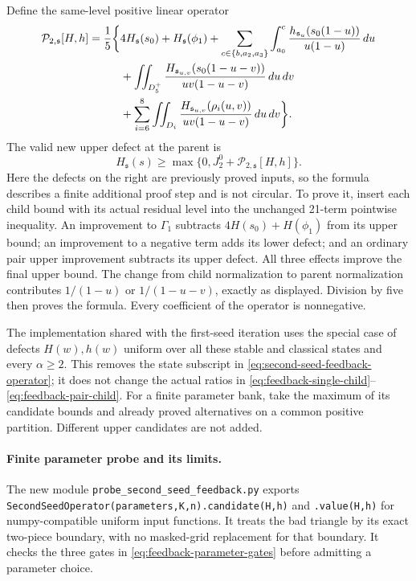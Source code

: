 \documentclass[11pt]{article}
\begin{document}
Define the same-level positive linear operator
\begin{align}
 \mathcal P_{2,\mathfrak s}[H,h]
 =\frac15\bigg\{&4H_{\mathfrak s}(s_0)+H_{\mathfrak s}(\phi_1)
 +\sum_{c\in\{b,a_2,a_3\}}\int_{a_0}^{c}
 \frac{h_{\mathfrak s_u}(s_0(1-u))}{u(1-u)}\,du\notag\\
 &+\iint_{D_5^+}
 \frac{H_{\mathfrak s_{u,v}}(s_0(1-u-v))}
      {uv(1-u-v)}\,du\,dv\notag\\
 &+\sum_{i=6}^8\iint_{D_i}
 \frac{H_{\mathfrak s_{u,v}}(\rho_i(u,v))}
      {uv(1-u-v)}\,du\,dv\bigg\}.
 \label{eq:second-seed-feedback-operator}
\end{align}
The valid new upper defect at the parent is
\begin{equation}\label{eq:second-seed-feedback-bound}
 H_{\mathfrak s}(s)\ge
 \max\{0,J_2^0+\mathcal P_{2,\mathfrak s}[H,h]\}.
\end{equation}
Here the defects on the right are previously proved inputs, so the
formula describes a finite additional proof step and is not circular.
To prove it, insert each child bound with its actual residual level
into the unchanged 21-term pointwise inequality.  An improvement
to $\Gamma_1$ subtracts $4H(s_0)+H(\phi_1)$ from its upper bound;
an improvement to a negative term adds its lower defect; and an
ordinary pair upper improvement subtracts its upper defect.
All three effects improve the final upper bound.  The change from
child normalization to parent normalization contributes
$1/(1-u)$ or $1/(1-u-v)$, exactly as displayed.  Division by five
then proves the formula.  Every coefficient of the operator is
nonnegative.

The implementation shared with the first-seed iteration uses the
special case of defects $H(w),h(w)$ uniform over all these stable
and classical states and every $\alpha\ge2$.  This removes the
state subscript in \eqref{eq:second-seed-feedback-operator}; it does
not change the actual ratios in
\eqref{eq:feedback-single-child}--\eqref{eq:feedback-pair-child}.
For a finite parameter bank, take the maximum of its candidate
bounds and already proved alternatives on a common positive
partition.  Different upper candidates are not added.

\paragraph{Finite parameter probe and its limits.}
The new module \texttt{probe\_second\_seed\_feedback.py} exports
\texttt{SecondSeedOperator(parameters,K,n).candidate(H,h)} and
\texttt{.value(H,h)} for numpy-compatible uniform input functions.
It treats the bad triangle by its exact two-piece boundary, with
no masked-grid replacement for that boundary.  It checks the
three gates in \eqref{eq:feedback-parameter-gates} before admitting
a parameter choice.
\end{document}
